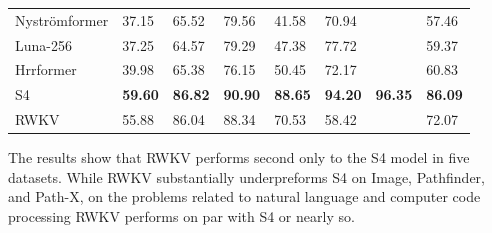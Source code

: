 \documentclass[11pt]{article}
\newcommand{\xmark}{\ding{55}}%
\begin{document}
\begin{table}[ht!]
\begin{tabular}{@{}llllllll@{}}
        Nystr{\"o}mformer     & 37.15             & 65.52             & 79.56  & 41.58             & 70.94               & \xmark          & 57.46             \\
        Luna-256              & 37.25             & 64.57             & 79.29              & 47.38 & 77.72               & \xmark          & 59.37 \\
        Hrrformer             & 39.98             & 65.38             & 76.15              & 50.45                       & 72.17 & \xmark & 60.83 \\        \midrule
        S4                    & \textbf{59.60}    & \textbf{86.82}    & \textbf{90.90}     & \textbf{88.65}    & \textbf{94.20}      & \textbf{96.35}  & \textbf{86.09}    \\
        RWKV                  & 55.88    & 86.04    & 88.34     & 70.53    & 58.42       & \xmark  & 72.07    \\
        \bottomrule
    \end{tabular}
    \label{tab:lra}
\end{table}

The results show that RWKV performs second only to the S4 model in five datasets. While RWKV substantially underpreforms S4 on Image, Pathfinder, and Path-X, on the problems related to natural language and computer code processing RWKV performs on par with S4 or nearly so.
\end{document}
